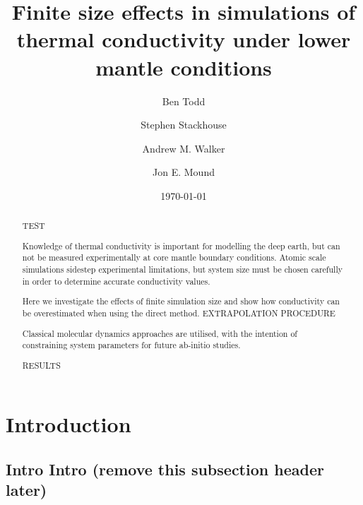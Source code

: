 \documentclass[%
preprint,                                  %
nofootinbib,
 amsmath,amssymb,
 aps,
]{revtex4-1}
\begin{document}
\newcommand{\wmk}{Wm$^{-1}$K$^{-1}$}


\title{Finite size effects in simulations of thermal conductivity under lower mantle conditions}%

\author{Ben Todd}
\author{Stephen Stackhouse}
\author{Andrew M. Walker}
\author{Jon E. Mound}


\date{\today}%

\begin{abstract}
TEST

Knowledge of thermal conductivity is important for modelling the deep earth, but can not be measured experimentally at core mantle boundary conditions. Atomic scale simulations sidestep experimental limitations, but system size must be chosen carefully in order to determine accurate conductivity values.

Here we investigate the effects of finite simulation size and show how conductivity can be overestimated when using the direct method. EXTRAPOLATION PROCEDURE

Classical molecular dynamics approaches are utilised, with the intention of constraining system parameters for future ab-initio studies.

RESULTS
\end{abstract}

\maketitle




\section{\label{sec:intro}Introduction}

\subsection{\label{sec:intro.intro}Intro Intro (remove this subsection header later)}
\end{document}
